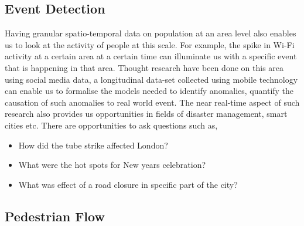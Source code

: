 \subsection{Event Detection}


Having granular spatio-temporal data on population at an area level also enables us to look at the activity of people at this scale.
For example, the spike in Wi-Fi activity at a certain area at a certain time can illuminate us with a specific event that is happening in that area.
Thought research have been done on this area using social media data, a longitudinal data-set collected using mobile technology can enable us to formalise the models needed to identify anomalies, quantify the causation of such anomalies to real world event.
The near real-time aspect of such research also provides us opportunities in fields of disaster management, smart cities etc. 
There are opportunities to ask questions such as,

\begin{itemize}
  \setlength{\itemindent}{2em}
  \itemsep-0.25em
  \item How did the tube strike affected London?
  \item What were the hot spots for New years celebration?
  \item What was effect of a road closure in specific part of the city?
\end{itemize}

\subsection{Pedestrian Flow}


